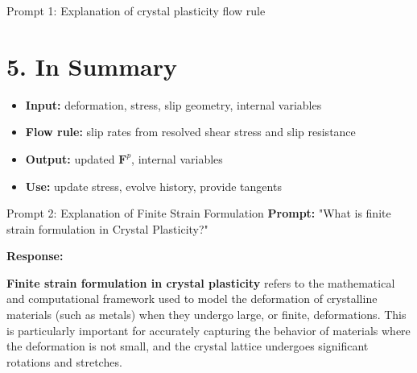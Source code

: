 \documentclass[12pt]{article}
\begin{document}
\begin{summary}{Prompt 1: Explanation of crystal plasticity flow rule}
\section*{5. In Summary}
\begin{itemize}
    \item \textbf{Input:} deformation, stress, slip geometry, internal variables  
    \item \textbf{Flow rule:} slip rates from resolved shear stress and slip resistance  
    \item \textbf{Output:} updated \( \mathbf{F}^p \), internal variables  
    \item \textbf{Use:} update stress, evolve history, provide tangents  
\end{itemize}
\end{summary}



\begin{summary}{Prompt 2: Explanation of Finite Strain Formulation}
\textbf{Prompt:} "What is finite strain formulation in Crystal Plasticity?"
\vspace{1em}

\textbf{Response:}

\vspace{1em}

\textbf{Finite strain formulation in crystal plasticity} refers to the mathematical
and computational framework used to model the deformation of crystalline
materials (such as metals) when they undergo large, or finite, deformations.
This is particularly important for accurately capturing the behavior of
materials where the deformation is not small, and the crystal lattice undergoes
significant rotations and stretches.
\end{summary}
\end{document}
